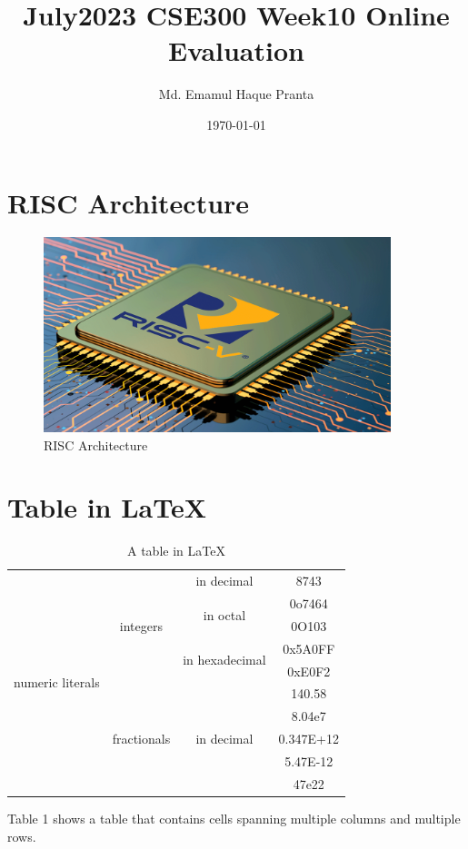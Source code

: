\documentclass[11pt]{article}
\title{July2023 CSE300 Week10 Online Evaluation}
\author{Md. Emamul Haque Pranta}
\date{\today}
\begin{document}
    \maketitle
    \tableofcontents

\newpage
\section{RISC Architecture}
\begin{figure}[h]
    \centering
    \includegraphics[width=0.9\textwidth]{Images/risc.png}
    \caption{RISC Architecture}
    \label{fig:risc}
\end{figure}

\section{Table in \LaTeX}
\begin{table}[h]
    \centering
    \begin{tabular}{|c|c|c|c|}
        \hline
        \multirow{10}{*}{numeric literals} & \multirow{5}{*}{integers} & in decimal & 8743 \\
        \cline{3-4}
        & & \multirow{2}{*}{in octal} & 0o7464 \\
        \cline{4-4}
        & & & 0O103 \\ 
        \cline{3-4}
        & & \multirow{2}{*}{in hexadecimal} & 0x5A0FF \\
        \cline{4-4}
        & & & 0xE0F2 \\
        \cline{2-4}
        & \multirow{5}{*}{fractionals} & \multirow{5}{*}{in decimal} & 140.58 \\
        \cline{4-4} 
        & & & 8.04e7 \\
        \cline{4-4}
        & & & 0.347E+12 \\
        \cline{4-4}
        & & & 5.47E-12 \\
        \cline{4-4}
        & & & 47e22 \\
        \hline
    \end{tabular}
    \caption{A table in \LaTeX}
    \label{tab:table}
\end{table}
Table 1 shows a table that contains cells spanning multiple columns and multiple rows. \cite{ln}
\end{document}
